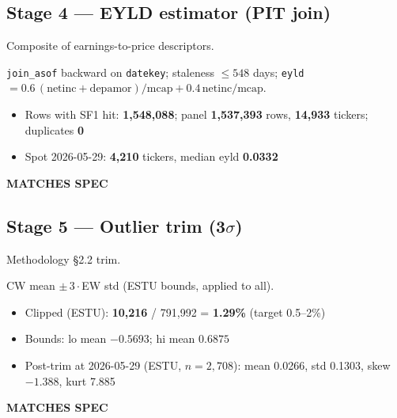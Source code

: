 \documentclass[11pt,a4paper]{article}
\newcommand{\PASS}[1]{\textcolor{pass}{\textbf{#1}}}
\begin{document}
\subsection{Stage 4 --- EYLD estimator (PIT join)}

\begin{description}[style=nextline]
  \item[PDF SPEC] Composite of earnings-to-price descriptors.
  \item[Implementation] \texttt{join\_asof} backward on \texttt{datekey}; staleness $\leq548$ days; \texttt{eyld} $= 0.6\,(\text{netinc}+\text{depamor})/\text{mcap} + 0.4\,\text{netinc}/\text{mcap}$.
  \item[Observed]\phantom{x}
    \begin{itemize}[nosep, topsep=-\parskip]
      \item Rows with SF1 hit: \textbf{1{,}548{,}088}; panel \textbf{1{,}537{,}393} rows, \textbf{14{,}933} tickers; duplicates \textbf{0}
      \item Spot 2026-05-29: \textbf{4{,}210} tickers, median eyld \textbf{0.0332}
    \end{itemize}
  \item[Status] \PASS{MATCHES SPEC}
\end{description}

\subsection{Stage 5 --- Outlier trim (3$\sigma$)}

\begin{description}[style=nextline]
  \item[PDF SPEC] Methodology \S2.2 trim.
  \item[Implementation] CW mean $\pm\,3\cdot$EW std (ESTU bounds, applied to all).
  \item[Observed]\phantom{x}
    \begin{itemize}[nosep, topsep=-\parskip]
      \item Clipped (ESTU): \textbf{10{,}216} / 791{,}992 = \textbf{1.29\%} (target 0.5--2\%)
      \item Bounds: lo mean $-0.5693$; hi mean $0.6875$
      \item Post-trim at 2026-05-29 (ESTU, $n=2{,}708$): mean 0.0266, std 0.1303, skew $-1.388$, kurt 7.885
    \end{itemize}
  \item[Status] \PASS{MATCHES SPEC}
\end{description}
\end{document}
